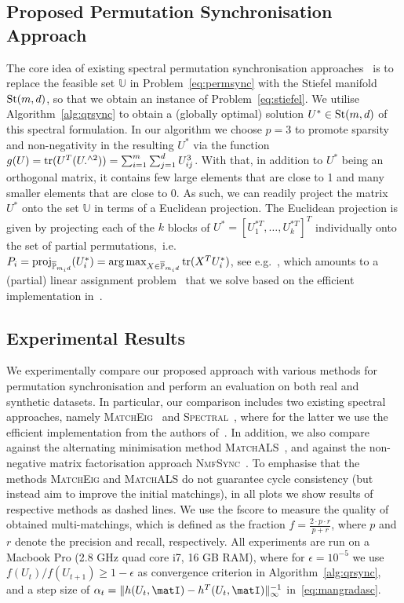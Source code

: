 \documentclass{article}
\begin{document}
\subsection{Proposed Permutation Synchronisation Approach} The core idea of existing spectral permutation synchronisation approaches~\cite{Pachauri:2013wx,shen2016normalized,Maset:YO8y6VRb} is to replace the feasible set $\mathbb{U}$ in Problem~\eqref{eq:permsync} with the Stiefel manifold $\operatorname{St}(m,d)$, so that we obtain an instance of Problem~\eqref{eq:stiefel}. We utilise Algorithm~\ref{alg:qrsync} to obtain a (globally optimal) solution $U^* \in \operatorname{St}(m,d)$ of this spectral formulation. In our algorithm we choose $p=3$ to promote sparsity and non-negativity  in the resulting $U^*$ via the function $g(U) = \operatorname{tr}(U^T(U.^{\wedge 2})) = \sum_{i=1}^m \sum_{j=1}^d U_{ij}^3$. With that, in addition to $U^*$ being an orthogonal matrix, it contains few large elements that are close to 1 and many smaller elements that are close to 0. As such, we can readily project the matrix $U^*$ onto the set $\mathbb{U}$ in terms of a Euclidean projection. The Euclidean projection is given by projecting each of the $k$ blocks of $U^* = [U_1^{*T}, \ldots, U_k^{*T}]^T$ individually onto the set of %
partial permutations,~i.e.~$P_i = \operatorname{proj}_{\overline{\mathbb{P}}_{m_id}}(U_i^*) = \operatorname*{arg\,max}_{X \in \overline{\mathbb{P}}_{m_id}} \operatorname{tr}(X^T U_i^*)$, see e.g.~\cite{bernard2019synchronisation},
which amounts to a (partial) linear assignment problem~\cite{Munkres:1957ju,Bertsekas:1998vt} that we solve based on the efficient implementation in~\cite{bernard2016fast}.
%



\subsection{Experimental Results}\label{sec:exp}
We experimentally compare our proposed approach with various methods for permutation synchronisation and perform an evaluation on both real and synthetic datasets. In particular, our comparison includes two existing spectral approaches, namely \textsc{MatchEig}~\cite{Maset:YO8y6VRb} and \textsc{Spectral}~\cite{Pachauri:2013wx}, where for the latter we use the efficient implementation from the authors of~\cite{zhou2015multi}. In addition, we also compare against the alternating minimisation method \textsc{MatchALS}~\cite{zhou2015multi}, and against the non-negative matrix factorisation approach \textsc{NmfSync}~\cite{bernard2019synchronisation}. To emphasise that the methods \textsc{MatchEig} and \textsc{MatchALS} do not guarantee cycle consistency (but instead  aim to improve the initial matchings), in all plots we show  results of respective methods as dashed lines.
We use the fscore to measure the quality of obtained multi-matchings, which is defined as the fraction $f = \frac{2 \cdot p \cdot r}{p + r}$, where $p$ and $r$ denote the precision and recall, respectively. All experiments are run on a Macbook Pro (2.8 GHz quad core i7, 16 GB RAM), where for $\epsilon = 10^{-5}$ we use $f(U_t)/f(U_{t+1})  \geq 1-\epsilon$  as convergence criterion in Algorithm~\ref{alg:qrsync}, and a step size of $\alpha_t = \| h(U_t,\matI) - h^T(U_t,\matI)\|_{\infty}^{-1}$ in~\eqref{eq:mangradasc}.
\end{document}
